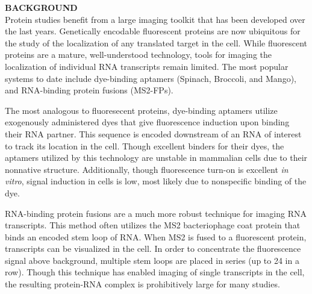 \textbf{BACKGROUND}\\
Protein studies benefit from a large imaging toolkit that has been developed over the last  years. Genetically encodable fluorescent proteins are now ubiquitous for the study of the localization of any translated target in the cell. While fluorescent proteins are a mature, well-understood technology, tools for imaging the localization of individual RNA transcripts remain limited. The most popular systems to date include dye-binding aptamers (Spinach\cite{PaigeRNAMimicsGreen2011}, Broccoli\cite{FilonovBroccoliRapidSelection2014}, and Mango\cite{AutourFluorogenicRNAMango2018,DolgosheinaRNAMangoAptamerFluorophore2014}), and RNA-binding protein fusions (MS2-FPs).\cite{FuscoSinglemRNAMolecules2003}

The most analogous to fluoresecent proteins, dye-binding aptamers utilize exogenously administered dyes that give fluorescence induction upon binding their RNA partner.\cite{PaigeRNAMimicsGreen2011,FilonovBroccoliRapidSelection2014,AutourFluorogenicRNAMango2018,DolgosheinaRNAMangoAptamerFluorophore2014} This sequence is encoded downstream of an RNA of interest to track its location in the cell. Though excellent binders for their dyes, the aptamers utilized by this technology are unstable in mammalian cells due to their nonnative structure.\cite{EtzelSyntheticRiboswitchesPlug2017} Additionally, though fluorescence turn-on is excellent \textit{in vitro}, signal induction in cells is low, most likely due to nonspecific binding of the dye.

RNA-binding protein fusions are a much more robust technique for imaging RNA transcripts.\cite{FuscoSinglemRNAMolecules2003} This method often utilizes the MS2 bacteriophage coat protein that binds an encoded stem loop of RNA. When MS2 is fused to a fluorescent protein, transcripts can be visualized in the cell. In order to concentrate the fluorescence signal above background, multiple stem loops are placed in series (up to 24 in a row). Though this technique has enabled imaging of single transcripts in the cell,\cite{MorisakiRealtimequantificationsingle2016,FuscoSinglemRNAMolecules2003} the resulting protein-RNA complex is prohibitively large for many studies.



